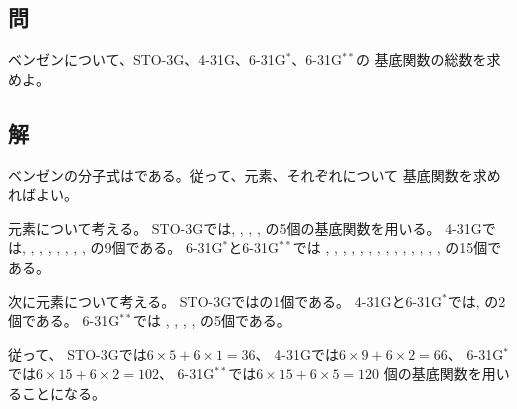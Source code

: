 \subsection{問}
ベンゼンについて、STO-3G、4-31G、6-31G$^{\ast}$、6-31G$^{\ast\ast}$の
基底関数の総数を求めよ。

\subsection{解}
ベンゼンの分子式はである。従って、元素、それぞれについて
基底関数を求めればよい。

元素について考える。
STO-3Gでは, , , , の5個の基底関数を用いる。
4-31Gでは, , , , ,
, , , 
の9個である。
6-31G$^{\ast}$と6-31G$^{\ast\ast}$では
, , , , ,
, , , ,
, , , , , 
の15個である。

次に元素について考える。
STO-3Gではの1個である。
4-31Gと6-31G$^{\ast}$では, の2個である。
6-31G$^{\ast\ast}$では
, , , , の5個である。

従って、
STO-3Gでは$6\times 5 + 6\times 1 =36$、
4-31Gでは$6\times 9 + 6\times 2 =66$、
6-31G$^{\ast}$では$6\times 15 + 6\times 2 =102$、
6-31G$^{\ast\ast}$では$6\times 15 + 6\times 5 =120$
個の基底関数を用いることになる。


